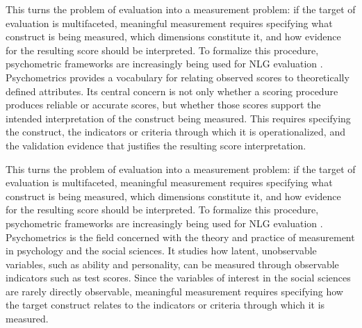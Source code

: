 This turns the problem of evaluation into a measurement problem: if the target of evaluation is multifaceted, meaningful measurement requires specifying what construct is being measured, which dimensions constitute it, and how evidence for the resulting score should be interpreted. To formalize this procedure, psychometric frameworks are increasingly being used for NLG evaluation \citep{xiaoEvaluatingEvaluationMetrics2023, linPromptsConstructsDualValidity2025, binetteImprovingValidityPractical2024, beanMeasuringWhatMatters2025, salaudeenMeasurementMeaningValidityCentered2025, wangEvaluatingGeneralPurposeAI, kardanovaNovelPsychometricsBasedApproach2024, federiakinImprovingLLMLeaderboards2025, PDFModernLLM2026, feuerWhenJudgmentBecomes2025, alaaMedicalLargeLanguage2025}. Psychometrics provides a vocabulary for relating observed scores to theoretically defined attributes. Its central concern is not only whether a scoring procedure produces reliable or accurate scores, but whether those scores support the intended interpretation of the construct being measured. This requires specifying the construct, the indicators or criteria through which it is operationalized, and the validation evidence that justifies the resulting score interpretation.

This turns the problem of evaluation into a measurement problem: if the target of evaluation is multifaceted, meaningful measurement requires specifying what construct is being measured, which dimensions constitute it, and how evidence for the resulting score should be interpreted. To formalize this procedure, psychometric frameworks are increasingly being used for NLG evaluation \citep{xiaoEvaluatingEvaluationMetrics2023, linPromptsConstructsDualValidity2025, binetteImprovingValidityPractical2024, beanMeasuringWhatMatters2025, salaudeenMeasurementMeaningValidityCentered2025, wangEvaluatingGeneralPurposeAI, kardanovaNovelPsychometricsBasedApproach2024, federiakinImprovingLLMLeaderboards2025, PDFModernLLM2026, feuerWhenJudgmentBecomes2025, alaaMedicalLargeLanguage2025}. Psychometrics is the field concerned with the theory and practice of measurement in psychology and the social sciences. It studies how latent, unobservable variables, such as ability and personality, can be measured through observable indicators such as test scores. Since the variables of interest in the social sciences are rarely directly observable, meaningful measurement requires specifying how the target construct relates to the indicators or criteria through which it is measured.

